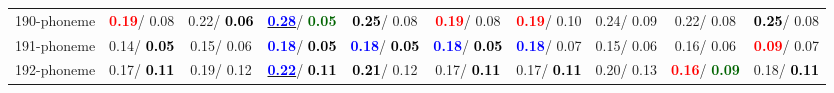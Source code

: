 \begin{table}[h]
\begin{center}
{\begin{tabular}{lc|c|c|c|c|c|c|c|c}
190-phoneme & \textcolor{red}{\textbf{  0.19}}/  0.08 &   0.22/\textcolor{black}{\textbf{  0.06}} & \underline{\textcolor{blue}{\textbf{  0.28}}}/\textcolor{darkgreen}{\textbf{  0.05}} & \textcolor{black}{\textbf{  0.25}}/  0.08 & \textcolor{red}{\textbf{  0.19}}/  0.08 & \textcolor{red}{\textbf{  0.19}}/  0.10 &   0.24/  0.09 &   0.22/  0.08 & \textcolor{black}{\textbf{  0.25}}/  0.08 \\
191-phoneme &   0.14/\textcolor{black}{\textbf{  0.05}} &   0.15/  0.06 & \textcolor{blue}{\textbf{  0.18}}/\textcolor{black}{\textbf{  0.05}} & \textcolor{blue}{\textbf{  0.18}}/\textcolor{black}{\textbf{  0.05}} & \textcolor{blue}{\textbf{  0.18}}/\textcolor{black}{\textbf{  0.05}} & \textcolor{blue}{\textbf{  0.18}}/  0.07 &   0.15/  0.06 &   0.16/  0.06 & \textcolor{red}{\textbf{  0.09}}/  0.07 \\
192-phoneme &   0.17/\textcolor{black}{\textbf{  0.11}} &   0.19/  0.12 & \underline{\textcolor{blue}{\textbf{  0.22}}}/\textcolor{black}{\textbf{  0.11}} & \textcolor{black}{\textbf{  0.21}}/  0.12 &   0.17/\textcolor{black}{\textbf{  0.11}} &   0.17/\textcolor{black}{\textbf{  0.11}} &   0.20/  0.13 & \textcolor{red}{\textbf{  0.16}}/\textcolor{darkgreen}{\textbf{  0.09}} &   0.18/\textcolor{black}{\textbf{  0.11}} \\\end{tabular}}\label{stratsALCKappa5AllRedux50a}
\end{center}
\end{table}
